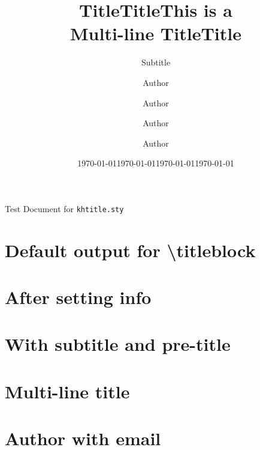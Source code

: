 \documentclass{article}
\begin{document}
\begin{center}
\LARGE Test Document for \texttt{khtitle.sty}
\vspace{1em}
\end{center}


\section*{Default output for \textbackslash titleblock}

\begin{examplebox}
\titleblock
\end{examplebox}


\section*{After setting info}

\begin{examplebox}
\title{Title}
\author{Author}
\date{\today}
\titleblock
\end{examplebox}


\section*{With subtitle and pre-title}

\begin{examplebox}
\title{Title}
\subtitle{Subtitle}
\author{Author}
\date{\today}
\titleblock
\end{examplebox}


\section*{Multi-line title}

\begin{examplebox}
\title{This is a\\Multi-line Title}
\author{Author}
\date{\today}
\titleblock
\end{examplebox}


\section*{Author with email}
\begin{examplebox}
\title{Title}
\author{Author}
\date{\today}
\titleblock
\end{examplebox}
\end{document}
